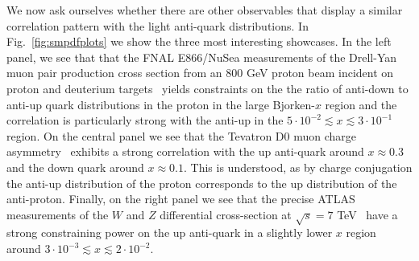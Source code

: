 \documentclass[withindex,glossary]{cam-thesis}
\begin{document}
We now ask ourselves whether there are other observables that display a similar correlation pattern with the light anti-quark distributions. 
In Fig.~\ref{fig:smpdfplots} we show the three most interesting showcases. In the left panel, we see that that the FNAL E866/NuSea measurements 
of the Drell-Yan muon pair production cross section from an 800 \rm{GeV} proton beam incident on proton and deuterium targets~\cite{NuSea:2001idv} 
yields constraints on the 
the ratio of anti-down to anti-up quark distributions in the proton in the large Bjorken-$x$ region and the correlation is 
particularly strong with the anti-up in the $5\cdot 10^{-2}\lesssim x \lesssim 3\cdot 10^{-1}$ region.
On the central panel we see that the Tevatron D0 muon charge asymmetry~\cite{D0:2013xqc} exhibits a strong correlation with the 
up anti-quark around $x\approx 0.3$ and the down quark around $x\approx 0.1$. This is understood, as by charge conjugation the 
anti-up distribution of the proton corresponds to the up distribution of the anti-proton. Finally, on the right 
panel we see that the precise ATLAS measurements of the $W$ and $Z$ differential cross-section at $\sqrt{s}=7$ TeV~\cite{ATLAS:2016nqi} 
have a strong constraining power on the up anti-quark in a slightly lower $x$ region around $3\cdot 10^{-3}\lesssim x \lesssim 2\cdot 10^{-2}$.
%
\end{document}
